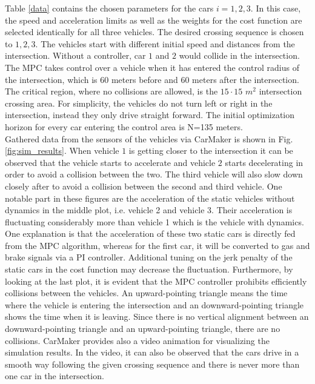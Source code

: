 \documentclass[letterpaper,10pt,conference]{ieeeconf}
\begin{document}
Table \ref{data} contains the chosen parameters for the cars $i=1,2,3$. In this case, the speed and acceleration limits as well as the weights for the cost function are selected identically for all three vehicles. The desired crossing sequence is chosen to $1,2,3$. The vehicles start with different initial speed and distances from the intersection. Without a controller, car $1$ and $2$ would collide in the intersection. The MPC takes control over a vehicle when it has entered the control radius of the intersection, which is $60$ meters before and $60$ meters after the intersection. The critical region, where no collisions are allowed, is the $15\cdot15$ $m^2$ intersection crossing area. For simplicity, the vehicles do not turn left or right in the intersection, instead they only drive straight forward. The initial optimization horizon for every car entering the control area is N=135 meters.\\ \indent 
Gathered data from the sensors of the vehicles via CarMaker is shown in Fig. \ref{fig:sim_results}. When vehicle $1$ is getting closer to the intersection it can be observed that the vehicle starts to accelerate and vehicle $2$ starts decelerating in order to avoid a collision between the two. The third vehicle will also slow down closely after to avoid a collision between the second and third vehicle. One notable part in these figures are the acceleration of the static vehicles without dynamics in the middle plot, i.e. vehicle 2 and vehicle 3. Their acceleration is fluctuating considerably more than vehicle 1 which is the vehicle with dynamics. One explanation is that the acceleration of these two static cars is directly fed from the MPC algorithm, whereas for the first car, it will be converted to gas and brake signals via a PI controller. Additional tuning on the jerk penalty of the static cars in the cost function may decrease the fluctuation. Furthermore, by looking at the last plot, it is evident that the MPC controller prohibits efficiently collisions  between the vehicles. An upward-pointing triangle means the time where the vehicle is entering the intersection and an downward-pointing triangle shows the time when it is leaving. Since there is no vertical alignment between an downward-pointing triangle and an upward-pointing triangle, there are no collisions. CarMaker provides also a video animation for visualizing the simulation results. In the video, it can also be observed that the cars drive in a smooth way following the given crossing sequence and there is never more than one car in the intersection.
\end{document}

